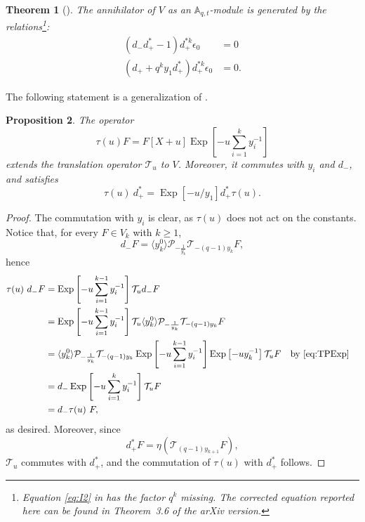\documentclass[reqno]{amsart}
\theoremstyle{plain}
\newtheorem{theorem}{Theorem}[section]
\newtheorem{proposition}[theorem]{Proposition}
\theoremstyle{definition}
\theoremstyle{remark}
\DeclareMathOperator{\Exp}{Exp}
\newcommand{\A}{\mathbb{A}}%
\newcommand{\<}{\langle}
\renewcommand{\>}{\rangle}
\begin{document}
\begin{theorem}[{\cite[Theorem~3.3]{Mellit2021Rational}}]
    \label{thm:annihilator}
    The annihilator of $V$ as an $\A_{q,t}$-module is generated by the relations\footnote{Equation \eqref{eq:I2} in \cite{Mellit2021Rational} has the factor $q^k$ missing. The corrected equation reported here can be found in Theorem~3.6 of the arXiv version.}:
    \begin{align}
        (d_- d_+^* -1) d_+^{*k} \epsilon_0 & = 0 \label{eq:I1} \tag{I1} \\
        (d_+ + q^k y_1 d_+^* ) d_+^{*k} \epsilon_0 & = 0. \label{eq:I2} \tag{I2}
    \end{align}
\end{theorem}

The following statement is a generalization of \cite[Proposition~3.24]{Mellit2021Rational}.

\begin{proposition}
    \label{prop:tau}
    The operator
    \[ \tau(u) F = F[X+u] \Exp\left[- u \sum_{i=1}^k y_i^{-1}\right] \]
    extends the translation operator $\mathcal{T}_{u}$ to $V$. Moreover, it commutes with $y_i$ and $d_-$, and satisfies
    \[ \tau(u)\ d_+^* = \Exp[-u/y_1] d_+^* \tau(u). \]
\end{proposition}

\begin{proof}
    The commutation with $y_i$ is clear, as $\tau(u)$ does not act on the constants.
    Notice that, for every $F \in V_k$ with $k \geq 1$,
    \[ d_- F = \langle y_k^0 \rangle \mathcal{P}_{-\frac{1}{y_k}} \mathcal{T}_{-(q-1)y_k}F, \]
    hence
    \begin{align*}
        \tau(u)\ d_- F & = \Exp\left[- u \sum_{i=1}^{k-1} y_i^{-1}\right] \mathcal{T}_{u} d_- F \\
        & = \Exp\left[- u \sum_{i=1}^{k-1} y_i^{-1}\right] \mathcal{T}_{u} \langle y_k^0 \rangle\mathcal{P}_{-\frac{1}{y_k}} \mathcal{T}_{-(q-1)y_k} F \\
        & = \langle y_k^0 \rangle\mathcal{P}_{-\frac{1}{y_k}} \mathcal{T}_{-(q-1)y_k} \Exp\left[- u \sum_{i=1}^{k-1} y_i^{-1}\right] \Exp \left[-u y_k^{-1}\right] \mathcal{T}_{u} F && \text{by \eqref{eq:TPExp}} \\
        & = d_- \Exp\left[- u \sum_{i=1}^{k} y_i^{-1}\right] \mathcal{T}_{u} F \\
        & = d_- \tau(u)\ F,
    \end{align*}
    as desired. Moreover, since
    \[ d_+^* F = \eta(\mathcal{T}_{(q-1)y_{k+1}} F), \]
    $\mathcal{T}_{u}$ commutes with $d_+^*$, and the commutation of $\tau(u)$ with $d_+^*$ follows.
\end{proof}
\end{document}

